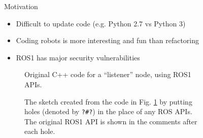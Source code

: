 \documentclass[final]{beamer}
\newlength{\sepwid}
\newlength{\onecolwid}
\newlength{\twocolwid}
\begin{document}
\begin{frame}[t]
\begin{columns}[t]
\begin{column}{\onecolwid}
\begin{block}{Motivation}

\begin{itemize}
\item Difficult to update code (e.g. Python 2.7 vs Python 3)
\item Coding robots is more interesting and fun than refactoring
\item ROS1 has major security vulnerabilities
\end{itemize}

\end{block}


\begin{figure}

\caption{Original C++ code for a ``listener'' node, using ROS1 APIs.}
\label{fig:listenercode}
\end{figure}

\begin{figure}


\caption{The sketch created from the code in Fig. \ref{fig:listenercode} by putting holes (denoted by \texttt{?\#?}) in the place of any ROS APIs. The original ROS1 API is shown in the comments after each hole.}
\end{figure}


\end{column} %

\begin{column}{\sepwid}\end{column} %

\begin{column}{\twocolwid} %


\begin{figure}


\end{figure}
\end{column}
\end{columns}
\end{frame}
\end{document}
